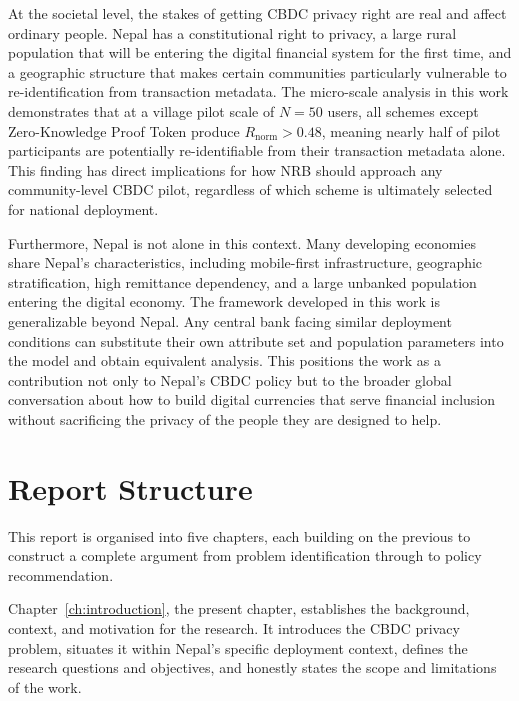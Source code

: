 At the societal level, the stakes of getting CBDC privacy
right are real and affect ordinary people. Nepal has a
constitutional right to privacy, a large rural population
that will be entering the digital financial system for
the first time, and a geographic structure that makes
certain communities particularly vulnerable to
re-identification from transaction metadata. The
micro-scale analysis in this work demonstrates that
at a village pilot scale of $N = 50$ users, all schemes
except Zero-Knowledge Proof Token produce $R_{\mathrm{norm}} > 0.48$,
meaning nearly half of pilot participants are potentially
re-identifiable from their transaction metadata alone.
This finding has direct implications for how NRB should
approach any community-level CBDC pilot, regardless of
which scheme is ultimately selected for national deployment.

Furthermore, Nepal is not alone in this context. Many
developing economies share Nepal's characteristics, including
mobile-first infrastructure, geographic stratification,
high remittance dependency, and a large unbanked population
entering the digital economy. The framework developed in
this work is generalizable beyond Nepal. Any central bank
facing similar deployment conditions can substitute their
own attribute set and population parameters into the model
and obtain equivalent analysis. This positions the work
as a contribution not only to Nepal's CBDC policy but
to the broader global conversation about how to build
digital currencies that serve financial inclusion without
sacrificing the privacy of the people they are designed
to help.

\section{Report Structure}
\label{sec:structure}

This report is organised into five chapters, each building
on the previous to construct a complete argument from
problem identification through to policy recommendation.

Chapter~\ref{ch:introduction}, the present chapter,
establishes the background, context, and motivation for
the research. It introduces the CBDC privacy problem,
situates it within Nepal's specific deployment context,
defines the research questions and objectives, and
honestly states the scope and limitations of the work.

